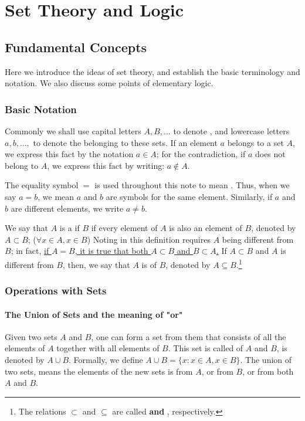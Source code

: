 \section{Set Theory and Logic}

\subsection{Fundamental Concepts}\label{sec:fundamental_concepts}

Here we introduce the ideas of set theory, and establish the basic terminology and notation. We also discuss some points of elementary logic.

\subsubsection{Basic Notation}\label{sec:basic_notation}

Commonly we shall use capital letters $A, B, \dots$ to denote \textbf{}, and lowercase letters $a, b, \dots,$ to denote the \textbf{} belonging to these sets. If an element $a$ belongs to a set $A$, we  express this fact by the notation $a \in A$; for the contradiction, if $a$ does not belong to $A$, we express this fact by writing: $a \not\in A$. 

The equality symbol $=$ is used throughout this note to mean . Thus, when we say $a = b$, we mean $a$ and $b$ are symbols for the same element. Similarly, if $a$ and $b$ are different elements, we write $a \neq b$.

We say that $A$ is a \textbf{} if $B$ if every element of $A$ is also an element of $B$, denoted by $A \subset B$; ($\forall x \in A, x \in B$) Noting in this definition requires $A$ being different from $B$; in fact, \uline{if $A = B$, it is true that both $A \subset B$ and $B \subset A$.} If $A \subset B$ and $A$ is different from $B$, then, we say that $A$ is \textbf{} of $B$, denoted by $A \subseteq B$.\footnote{The relations $\subset$ and $\subseteq$ are called \textbf{ and }, respectively.}

\subsubsection{Operations with Sets}\label{sec:operations_with_sets}

\paragraph{The Union of Sets and the meaning of "or"} Given two sets $A$ and $B$, one can form a set from them that consists of all the elements of $A$ together with all elements of $B$. This set is called \textbf{} of $A$ and $B$, is denoted by $A \cup B$. Formally, we define $A \cup B = \{x: x\in A, x \in B\}$. The union of two sets, means the elements of the new sets is from $A$, or from $B$, or from both $A$ and $B$.

